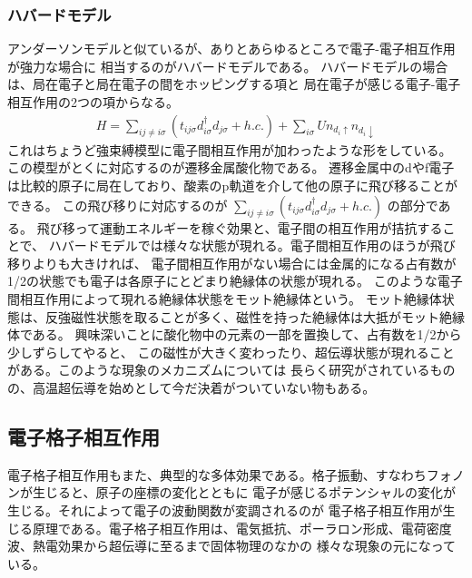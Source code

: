 \documentclass[letterpaper,10pt,dvipdfmx]{sphinxhowto}
\begin{document}
\subsubsection{ハバードモデル}
\label{\detokenize{index:id5}}
アンダーソンモデルと似ているが、ありとあらゆるところで電子-電子相互作用が強力な場合に
相当するのがハバードモデルである。
ハバードモデルの場合は、局在電子と局在電子の間をホッピングする項と
局在電子が感じる電子-電子相互作用の2つの項からなる。
\begin{equation*}
\begin{split}H=\sum_{i j\neq i\sigma}( t_{ij\sigma} d_{i\sigma}^\dagger d_{j\sigma}+h.c.) +\sum_{i\sigma}Un_{d_i\uparrow}n_{d_i\downarrow}\end{split}
\end{equation*}
これはちょうど強束縛模型に電子間相互作用が加わったような形をしている。
この模型がとくに対応するのが遷移金属酸化物である。
遷移金属中のdやf電子は比較的原子に局在しており、酸素のp軌道を介して他の原子に飛び移ることができる。
この飛び移りに対応するのが
\(\sum_{i j\neq i\sigma}( t_{ij\sigma} d_{i\sigma}^\dagger d_{j\sigma}+h.c.)\)
の部分である。
飛び移って運動エネルギーを稼ぐ効果と、電子間の相互作用が拮抗することで、
ハバードモデルでは様々な状態が現れる。電子間相互作用のほうが飛び移りよりも大きければ、
電子間相互作用がない場合には金属的になる占有数が1/2の状態でも電子は各原子にとどまり絶縁体の状態が現れる。
このような電子間相互作用によって現れる絶縁体状態をモット絶縁体という。
モット絶縁体状態は、反強磁性状態を取ることが多く、磁性を持った絶縁体は大抵がモット絶縁体である。
興味深いことに酸化物中の元素の一部を置換して、占有数を1/2から少しずらしてやると、
この磁性が大きく変わったり、超伝導状態が現れることがある。このような現象のメカニズムについては
長らく研究がされているものの、高温超伝導を始めとして今だ決着がついていない物もある。


\subsection{電子格子相互作用}
\label{\detokenize{index:id6}}
電子格子相互作用もまた、典型的な多体効果である。格子振動、すなわちフォノンが生じると、原子の座標の変化とともに
電子が感じるポテンシャルの変化が生じる。それによって電子の波動関数が変調されるのが
電子格子相互作用が生じる原理である。電子格子相互作用は、電気抵抗、ポーラロン形成、電荷密度波、熱電効果から超伝導に至るまで固体物理のなかの
様々な現象の元になっている。
\end{document}
